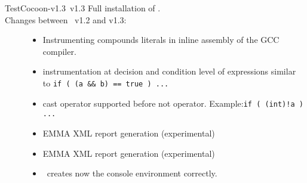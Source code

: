 \begin{TestCocoonDownload}
\begin{TestCocoonDownloadLink}
\end{TestCocoonDownloadLink}
\begin{ReleaseNote}{TestCocoon-v1.3}{\TestCocoon\ v1.3}
Full installation of \TestCocoon.\\
Changes between \TestCocoon\ v1.2 and v1.3:
\begin{description}
\item[\CoverageScanner]
  \begin{itemize}
    \item \NewFeature Instrumenting compounds literals in inline assembly of the GCC compiler.
    \item \BugFix instrumentation at decision and condition level of expressions similar to \lstinline$if ( (a && b) == true ) ...$
    \item \BugFix cast operator supported before not operator. Example:\lstinline$if ( (int)!a ) ...$
  \end{itemize}
\item[\CoverageBrowser]
  \begin{itemize}
    \item \NewFeature EMMA XML report generation (experimental)
  \end{itemize}
\item[\cmreport]
  \begin{itemize}
    \item \NewFeature EMMA XML report generation (experimental)
  \end{itemize}
\item[\toolselector]
  \begin{itemize}
    \item \BugFix \toolselector\ creates now the console environment correctly.
  \end{itemize}
%

\end{description}
\end{ReleaseNote}
\end{TestCocoonDownload}


